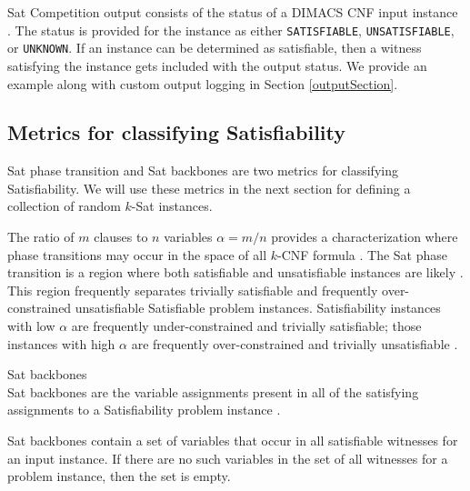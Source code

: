 
{\sc Sat} Competition output consists of the status of a DIMACS CNF input instance \cite{satcompetition}.  The status is provided for the instance as either \texttt{SATISFIABLE}, \texttt{UNSATISFIABLE}, or \texttt{UNKNOWN}.  If an instance can be determined as satisfiable, then a witness satisfying the instance gets included with the output status.  We provide an example along with custom output logging in Section \ref{outputSection}.
	
	\subsection{Metrics for classifying {\sc Satisfiability}}

{\sc Sat} phase transition and {\sc Sat} backbones are two metrics for classifying {\sc Satisfiability}.  We will use these metrics in the next section for defining a collection of random $k$-{\sc Sat} instances.
		


The ratio of $m$ clauses to $n$ variables $\alpha = m/n$ provides a characterization where phase transitions may occur in the space of all $k$-CNF formula \cite{Doherty08thehandbook,Gent94thesat}.  The {\sc Sat} phase transition is a region where both satisfiable and unsatisfiable instances are likely \cite{Gent94thesat}.  This region frequently separates trivially satisfiable and frequently over-constrained unsatisfiable {\sc Satisfiable} problem instances.  {\sc Satisfiability} instances with low $\alpha$ are frequently under-constrained and trivially satisfiable; those instances with high $\alpha$ are frequently over-constrained and trivially unsatisfiable \cite{Gent94thesat}.
		
\begin{definition}
{\sc Sat} backbones\\
{\sc Sat} backbones are the variable assignments present in all of the satisfying assignments to a {\sc Satisfiability} problem instance \cite{Zhang2001}. 

\end{definition}

{\sc Sat} backbones contain a set of variables that occur in all satisfiable witnesses for an input instance.  If there are no such variables in the set of all witnesses for a problem instance, then the set is empty.

